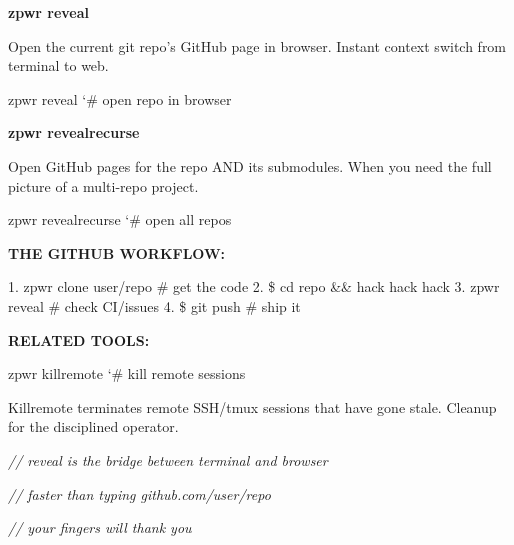 \documentclass[11pt,a4paper,twoside]{book}
\begin{document}
\vspace{12pt}
{\bfseries\color{neonyellow} zpwr reveal}\vspace{4pt}

Open the current git repo's GitHub page in browser. Instant context switch from terminal to web.

\begin{codebox}
\color{neongreen}zpwr reveal                 {\char`\#} open repo in browser\\
\end{codebox}


\vspace{12pt}
{\bfseries\color{neonyellow} zpwr revealrecurse}\vspace{4pt}

Open GitHub pages for the repo AND its submodules. When you need the full picture of a multi-repo project.

\begin{codebox}
\color{neongreen}zpwr revealrecurse          {\char`\#} open all repos\\
\end{codebox}


\vspace{12pt}
{\bfseries\color{neonyellow} THE GITHUB WORKFLOW:}\vspace{4pt}

1. zpwr clone user/repo       \# get the code 2. \$ cd repo \&\& hack hack hack 3. zpwr reveal                \# check CI/issues 4. \$ git push                   \# ship it


\vspace{12pt}
{\bfseries\color{neonyellow} RELATED TOOLS:}\vspace{4pt}

\begin{codebox}
\color{neongreen}zpwr killremote             {\char`\#} kill remote sessions\\
\end{codebox}

Killremote terminates remote SSH/tmux sessions that have gone stale. Cleanup for the disciplined operator.

{\small\itshape\color{dimtext} // reveal is the bridge between terminal and browser}

{\small\itshape\color{dimtext} // faster than typing github.com/user/repo}

{\small\itshape\color{dimtext} // your fingers will thank you}


\vspace{16pt}
\end{document}
